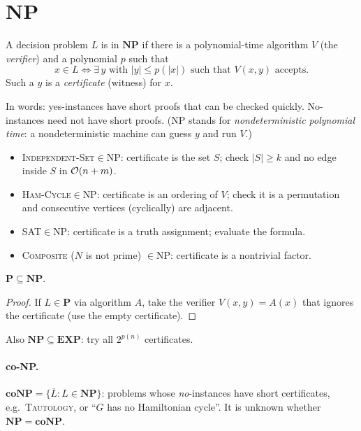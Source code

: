\section{NP}
\begin{definition}
A decision problem $L$ is in $\mathbf{NP}$ if there is a polynomial-time algorithm $V$ (the \emph{verifier}) and a polynomial $p$ such that
\[
x\in L\iff\exists\,y\text{ with }|y|\le p(|x|)\text{ such that }V(x,y)\text{ accepts}.
\]
Such a $y$ is a \emph{certificate} (witness) for $x$.
\end{definition}
In words: yes-instances have short proofs that can be checked quickly. No-instances need not have short proofs.
(NP stands for \emph{nondeterministic polynomial time}: a nondeterministic machine can guess $y$ and run $V$.)

\begin{example}
\begin{itemize}
  \item \textsc{Independent-Set}$\in$NP: certificate is the set $S$; check $|S|\ge k$ and no edge inside $S$ in $\mathcal{O}(n+m)$.
  \item \textsc{Ham-Cycle}$\in$NP: certificate is an ordering of $V$; check it is a permutation and consecutive vertices (cyclically) are adjacent.
  \item \textsc{SAT}$\in$NP: certificate is a truth assignment; evaluate the formula.
  \item \textsc{Composite} ($N$ is not prime) $\in$NP: certificate is a nontrivial factor.
\end{itemize}
\end{example}

\begin{theorem}
$\mathbf P\subseteq\mathbf{NP}$.
\end{theorem}
\begin{proof}
If $L\in\mathbf P$ via algorithm $A$, take the verifier $V(x,y)=A(x)$ that ignores the certificate (use the empty certificate).
\end{proof}
Also $\mathbf{NP}\subseteq\mathbf{EXP}$: try all $2^{p(n)}$ certificates.

\paragraph{co-NP.} $\mathbf{coNP}=\{\overline L: L\in\mathbf{NP}\}$: problems whose \emph{no}-instances have short certificates, e.g.\ \textsc{Tautology}, or
``$G$ has no Hamiltonian cycle''. It is unknown whether $\mathbf{NP}=\mathbf{coNP}$.

